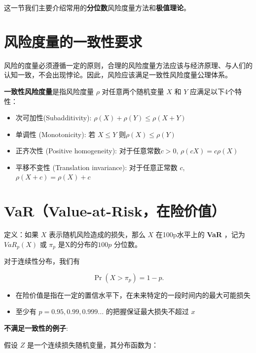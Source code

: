 \documentclass[
]{book}
\begin{document}
这一节我们主要介绍常用的\textbf{分位数}风险度量方法和\textbf{极值理论}。

\hypertarget{ux98ceux9669ux5ea6ux91cfux7684ux4e00ux81f4ux6027ux8981ux6c42}{%
\section{风险度量的一致性要求}\label{ux98ceux9669ux5ea6ux91cfux7684ux4e00ux81f4ux6027ux8981ux6c42}}

风险的度量必须遵循一定的原则，合理的风险度量方法应该与经济原理、与人们的认知一致，不会出现悖论。因此，风险应该满足一致性风险度量公理体系。

\textbf{一致性风险度量}是指风险度量 \(\rho\) 对任意两个随机变量 \(X\) 和 \(Y\) 应满足以下4个特性：

\begin{itemize}
\item
  次可加性(Subadditivity): \(\rho(X) + \rho(Y) \le \rho(X+Y)\)
\item
  单调性 (Monotonicity): 若 \(X\le Y\) 则\(\rho(X)\le \rho(Y)\)
\item
  正齐次性 (Positive homogeneity): 对于任意常数\(c>0\), \(\rho(cX)=c\rho(X)\)
\item
  平移不变性 (Translation invariance): 对于任意正常数 \(c\), \(\rho(X+c)=\rho(X)+c\)
\end{itemize}

\hypertarget{varvalue-at-riskux5728ux9669ux4ef7ux503c}{%
\section{VaR（Value-at-Risk，在险价值）}\label{varvalue-at-riskux5728ux9669ux4ef7ux503c}}

定义：如果 \(X\) 表示随机风险造成的损失，那么 \(X\) 在100p水平上的 \textbf{VaR} ，记为 \(VaR_p(X)\) 或 \(\pi_p\) 是X的分布的\(100p\) 分位数。

对于连续性分布，我们有

\[
\Pr(X>\pi_p)=1-p.
\]

\begin{itemize}
\item
  在险价值是指在一定的置信水平下，在未来特定的一段时间内的最大可能损失
\item
  至少有 \(p=0.95,0.99,0.999...\) 的把握保证最大损失不超过 \(x\)
\end{itemize}

\textbf{不满足一致性的例子}:

假设 \(Z\) 是一个连续损失随机变量，其分布函数为：
\end{document}
